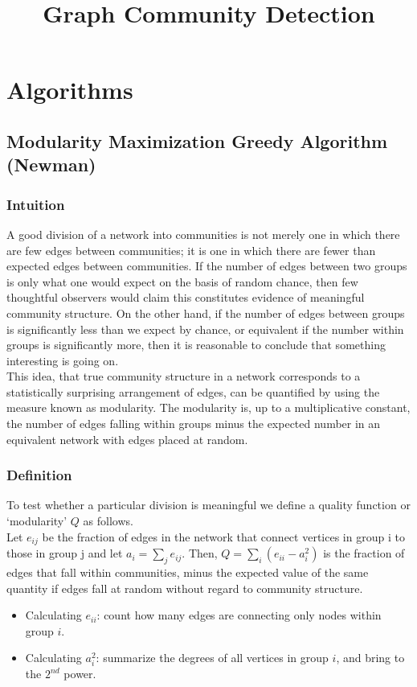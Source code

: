 \documentclass{article}
\author{}
\begin{document}
\title{Graph Community Detection}
\maketitle

\section{Algorithms}
\subsection{Modularity Maximization Greedy Algorithm (Newman)}
\subsubsection{Intuition}
A good division of a network into communities is not merely one in which there are few edges between communities; it is one in which there are fewer than expected edges between communities. If the number of edges between two groups is only what one would expect on the basis of random chance, then few thoughtful observers would claim this constitutes evidence of meaningful community structure. On the other hand, if the number of edges between groups is significantly less than we expect by chance, or equivalent if the number within groups is significantly more, then it is reasonable to conclude that something interesting is going on.\\
This idea, that true community structure in a network corresponds to a statistically surprising arrangement of edges, can be quantified by using the measure known as modularity. The modularity is, up to a multiplicative constant, the number of edges falling within groups minus the expected number in an equivalent network with edges placed at random.
\subsubsection{Definition}
To test whether a particular division is meaningful we define a quality function or `modularity' $Q$ as follows.\\
Let $e_{ij}$ be the fraction of edges in the network that connect vertices in group i to those in group j and let $a_{i} = \sum_{j}{e_{ij}}$. Then, $Q = \sum_{i} (e_{ii} - a_{i}^{2})$ is the fraction of edges that fall within communities, minus the expected value of the same quantity if edges fall at random without regard to community structure.
\begin{itemize}
    \item Calculating $e_{ii}$: count how many edges are connecting only nodes within group $i$.
    \item Calculating $a_{i}^{2}$: summarize the degrees of all vertices in group $i$, and bring to the $2^{nd}$ power.
\end{itemize}
\end{document}
